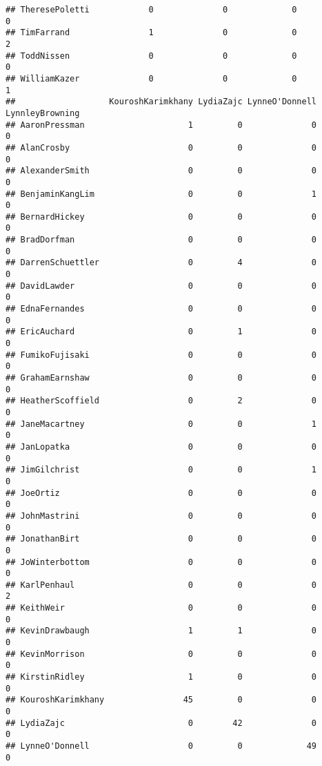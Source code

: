 \documentclass[
  12pt,
]{article}
\begin{document}
\begin{verbatim}
## TheresePoletti            0              0             0             0
## TimFarrand                1              0             0             2
## ToddNissen                0              0             0             0
## WilliamKazer              0              0             0             1
##                   KouroshKarimkhany LydiaZajc LynneO'Donnell LynnleyBrowning
## AaronPressman                     1         0              0               0
## AlanCrosby                        0         0              0               0
## AlexanderSmith                    0         0              0               0
## BenjaminKangLim                   0         0              1               0
## BernardHickey                     0         0              0               0
## BradDorfman                       0         0              0               0
## DarrenSchuettler                  0         4              0               0
## DavidLawder                       0         0              0               0
## EdnaFernandes                     0         0              0               0
## EricAuchard                       0         1              0               0
## FumikoFujisaki                    0         0              0               0
## GrahamEarnshaw                    0         0              0               0
## HeatherScoffield                  0         2              0               0
## JaneMacartney                     0         0              1               0
## JanLopatka                        0         0              0               0
## JimGilchrist                      0         0              1               0
## JoeOrtiz                          0         0              0               0
## JohnMastrini                      0         0              0               0
## JonathanBirt                      0         0              0               0
## JoWinterbottom                    0         0              0               0
## KarlPenhaul                       0         0              0               2
## KeithWeir                         0         0              0               0
## KevinDrawbaugh                    1         1              0               0
## KevinMorrison                     0         0              0               0
## KirstinRidley                     1         0              0               0
## KouroshKarimkhany                45         0              0               0
## LydiaZajc                         0        42              0               0
## LynneO'Donnell                    0         0             49               0

\end{verbatim}
\end{document}
